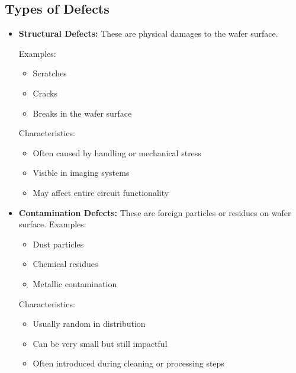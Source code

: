 \subsection{Types of Defects}
\begin{itemize}
     \item \textbf{Structural Defects:}
    These are physical damages to the wafer surface.

    Examples:
    \begin{itemize}
        \item Scratches
        \item Cracks
        \item Breaks in the wafer surface
    \end{itemize}
    Characteristics:
        \begin{itemize}
            \item Often caused by handling or mechanical stress
            \item Visible in imaging systems
            \item May affect entire circuit functionality
        \end{itemize}
      \item \textbf{Contamination Defects:}
        These are foreign particles or residues on wafer surface.
        Examples:
    \begin{itemize}
        \item Dust particles
        \item Chemical residues
        \item Metallic contamination
    \end{itemize}
    Characteristics:
        \begin{itemize}
            \item Usually random in distribution
            \item Can be very small but still impactful
            \item Often introduced during cleaning or processing steps
        \end{itemize}


\end{itemize}
